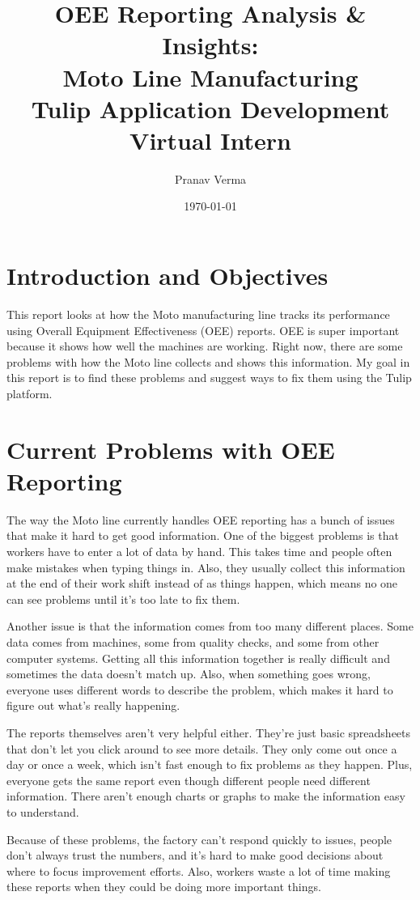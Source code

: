 \documentclass[11pt]{article}
\title{OEE Reporting Analysis \& Insights: \\Moto Line Manufacturing\\
{\large Tulip Application Development Virtual Intern}}
\author{Pranav Verma}
\date{\today}
\begin{document}
\maketitle

\section{Introduction and Objectives}

This report looks at how the Moto manufacturing line tracks its performance using Overall Equipment Effectiveness (OEE) reports. OEE is super important because it shows how well the machines are working. Right now, there are some problems with how the Moto line collects and shows this information. My goal in this report is to find these problems and suggest ways to fix them using the Tulip platform.

\section{Current Problems with OEE Reporting}

The way the Moto line currently handles OEE reporting has a bunch of issues that make it hard to get good information. One of the biggest problems is that workers have to enter a lot of data by hand. This takes time and people often make mistakes when typing things in. Also, they usually collect this information at the end of their work shift instead of as things happen, which means no one can see problems until it's too late to fix them.

Another issue is that the information comes from too many different places. Some data comes from machines, some from quality checks, and some from other computer systems. Getting all this information together is really difficult and sometimes the data doesn't match up. Also, when something goes wrong, everyone uses different words to describe the problem, which makes it hard to figure out what's really happening.

The reports themselves aren't very helpful either. They're just basic spreadsheets that don't let you click around to see more details. They only come out once a day or once a week, which isn't fast enough to fix problems as they happen. Plus, everyone gets the same report even though different people need different information. There aren't enough charts or graphs to make the information easy to understand.

Because of these problems, the factory can't respond quickly to issues, people don't always trust the numbers, and it's hard to make good decisions about where to focus improvement efforts. Also, workers waste a lot of time making these reports when they could be doing more important things.
\end{document}

